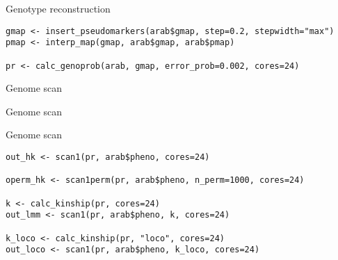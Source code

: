 \documentclass[12pt,t,aspectratio=169]{beamer}
\begin{document}
\begin{frame}[c,fragile]{Genotype reconstruction}

\begin{center} \begin{minipage}[c]{11.5cm} \begin{semiverbatim}
\begin{lstlisting}[linewidth=11.5cm]
gmap <- insert_pseudomarkers(arab$gmap, step=0.2, stepwidth="max")
pmap <- interp_map(gmap, arab$gmap, arab$pmap)

pr <- calc_genoprob(arab, gmap, error_prob=0.002, cores=24)
\end{lstlisting}
\end{semiverbatim} \end{minipage} \end{center}

\end{frame}



\begin{frame}[c]{Genome scan}


\end{frame}

\begin{frame}[c]{Genome scan}


\end{frame}


\begin{frame}[c,fragile]{Genome scan}

\begin{center} \begin{minipage}[c]{11.3cm} \begin{semiverbatim}
\begin{lstlisting}[linewidth=11.3cm]
out_hk <- scan1(pr, arab$pheno, cores=24)

operm_hk <- scan1perm(pr, arab$pheno, n_perm=1000, cores=24)

k <- calc_kinship(pr, cores=24)
out_lmm <- scan1(pr, arab$pheno, k, cores=24)

k_loco <- calc_kinship(pr, "loco", cores=24)
out_loco <- scan1(pr, arab$pheno, k_loco, cores=24)
\end{lstlisting}
\end{semiverbatim} \end{minipage} \end{center}

\end{frame}
\end{document}
